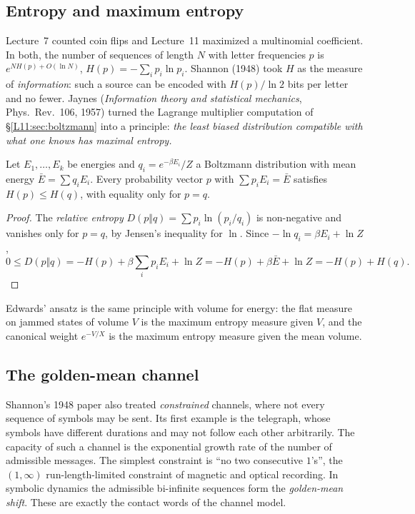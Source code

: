 \subsection{Entropy and maximum entropy}

Lecture~7 counted coin flips and Lecture~11 maximized a multinomial coefficient. In both, the number of
sequences of length $N$ with letter frequencies $p$ is $e^{NH(p)+O(\ln N)}$, $H(p)=-\sum_ip_i\ln p_i$.
Shannon (1948) took $H$ as the measure of \emph{information}: such a source can be encoded with
$H(p)/\ln2$ bits per letter and no fewer. Jaynes (\emph{Information theory and statistical mechanics},
Phys.\ Rev.~106, 1957) turned the Lagrange multiplier computation of \S\ref{L11:sec:boltzmann} into a
principle: \emph{the least biased distribution compatible with what one knows has maximal entropy.}

\begin{proposition}\label{SM:prop:jaynes}
Let $E_1,\dots,E_k$ be energies and $q_i=e^{-\beta E_i}/Z$ a Boltzmann distribution with mean energy
$\bar E=\sum q_iE_i$. Every probability vector $p$ with $\sum p_iE_i=\bar E$ satisfies $H(p)\le H(q)$, with
equality only for $p=q$.
\end{proposition}

\begin{proof}
The \emph{relative entropy} $D(p\Vert q)=\sum p_i\ln(p_i/q_i)$ is non-negative and vanishes only for $p=q$,
by Jensen's inequality for $\ln$. Since $-\ln q_i=\beta E_i+\ln Z$,
\[
  0\le D(p\Vert q)=-H(p)+\beta\sum_ip_iE_i+\ln Z=-H(p)+\beta\bar E+\ln Z=-H(p)+H(q).
\]
\end{proof}

Edwards' ansatz is the same principle with volume for energy: the flat measure on jammed states of
volume $V$ is the maximum entropy measure given $V$, and the canonical weight $e^{-V/X}$ is the maximum
entropy measure given the mean volume.

\subsection{The golden-mean channel}

Shannon's 1948 paper also treated \emph{constrained} channels, where not every sequence of symbols may be
sent. Its first example is the telegraph, whose symbols have different durations and may not follow each
other arbitrarily. The capacity of such a channel is the exponential growth rate of the number of
admissible messages. The simplest constraint is ``no two consecutive $1$'s'', the $(1,\infty)$
run-length-limited constraint of magnetic and optical recording. In symbolic dynamics the admissible
bi-infinite sequences form the \emph{golden-mean shift}. These are exactly the contact words of the
channel model.

